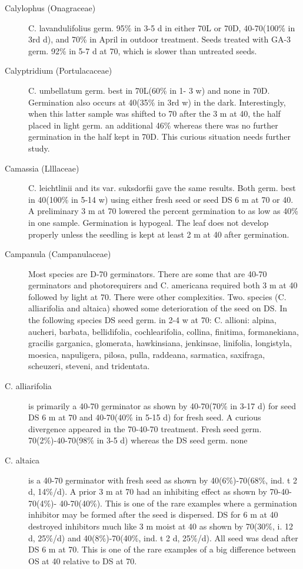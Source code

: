 \begin{description}
\item[Calylophus (Onagraceae)] C. lavandulifolius germ. 95\% in 3-5 d in either
70L or 70D, 40-70(100\% in 3rd d), and 70\% in April in outdoor treatment. Seeds
treated with GA-3 germ. 92\% in 5-7 d at 70, which is slower than untreated seeds.
\item[Calyptridium (Portulacaceae)] C. umbellatum germ. best in 70L(60\% in 1-
3 w) and none in 70D. Germination also occurs at 40(35\% in 3rd w) in the dark.
Interestingly, when this latter sample was shifted to 70 after the 3 m at 40, the half
placed in light germ. an additional 46\% whereas there was no further germination in
the half kept in 70D. This curious situation needs further study.

\item[Camassia (Llllaceae)] C. leichtlinii and its var. suksdorfii gave the same
results. Both germ. best in 40(100\% in 5-14 w) using either fresh seed or seed DS 6 m
at 70 or 40. A preliminary 3 m at 70 lowered the percent germination to as low as 40\%
in one sample. Germination is hypogeal. The leaf does not develop properly unless
the seedling is kept at least 2 m at 40 after germination.

\item[Campanula (Campanulaceae)] Most species are D-70 germinators.
There are some that are 40-70 germinators and photorequirers and C. americana
required both 3 m at 40 followed by light at 70. There were other complexities. Two.
species (C. alliarifolia and altaica) showed some deterioration of the seed on DS. In
the following species DS seed germ. in 2-4 w at 70: C. allioni: alpina, aucheri,
barbata, bellidifolia, cochlearifolia, collina, finitima, formanekiana, gracilis garganica,
glomerata, hawkinsiana, jenkinsae, linifolia, longistyla, moesica, napuligera, pilosa,
pulla, raddeana, sarmatica, saxifraga, scheuzeri, steveni, and tridentata.
\item[C. alliarifolia] is primarily a 40-70 germinator as shown by 40-70(70\% in 3-17 d)
for seed DS 6 m at 70 and 40-70(40\% in 5-15 d) for fresh seed. A curious divergence
appeared in the 70-40-70 treatment. Fresh seed germ. 70(2\%)-40-70(98\% in 3-5 d)
whereas the DS seed germ. none
\item[C. altaica] is a 40-70 germinator with fresh seed as shown by 40(6\%)-70(68\%,
ind. t 2 d, 14\%/d). A prior 3 m at 70 had an inhibiting effect as shown by 70-40-70(4\%)-
40-70(40\%). This is one of the rare examples where a germination inhibitor may be
formed after the seed is dispersed. DS for 6 m at 40 destroyed inhibitors much like 3
m moist at 40 as shown by 70(30\%, i. 12 d, 25\%/d) and 40(8\%)-70(40\%, ind. t 2 d,
25\%/d). All seed was dead after DS 6 m at 70. This is one of the rare examples of a
big difference between OS at 40 relative to DS at 70.


\end{description}
